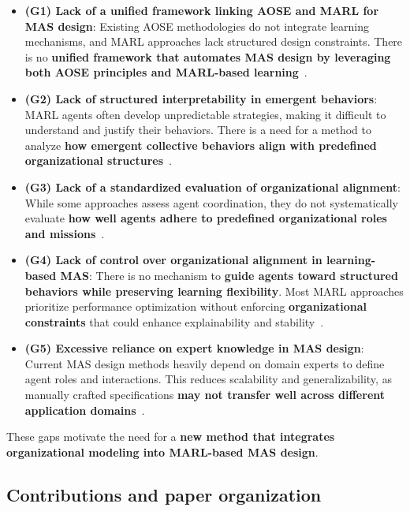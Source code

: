 \documentclass[pdflatex,sn-mathphys-num]{sn-jnl}%
\theoremstyle{thmstyleone}%
\theoremstyle{thmstyletwo}%
\theoremstyle{thmstylethree}%
\begin{document}
\begin{itemize}
    \item \textbf{(G1) Lack of a unified framework linking AOSE and MARL for MAS design}: Existing AOSE methodologies do not integrate learning mechanisms, and MARL approaches lack structured design constraints. There is no \textbf{unified framework that automates MAS design by leveraging both AOSE principles and MARL-based learning}~\cite{Cossentino2014}.
    
    \item \textbf{(G2) Lack of structured interpretability in emergent behaviors}: MARL agents often develop unpredictable strategies, making it difficult to understand and justify their behaviors. There is a need for a method to analyze \textbf{how emergent collective behaviors align with predefined organizational structures}~\cite{Du2022}.
    
    \item \textbf{(G3) Lack of a standardized evaluation of organizational alignment}: While some approaches assess agent coordination, they do not systematically evaluate \textbf{how well agents adhere to predefined organizational roles and missions}~\cite{Papoudakis2021}.
    
    \item \textbf{(G4) Lack of control over organizational alignment in learning-based MAS}: There is no mechanism to \textbf{guide agents toward structured behaviors while preserving learning flexibility}. Most MARL approaches prioritize performance optimization without enforcing \textbf{organizational constraints} that could enhance explainability and stability~\cite{Oroojlooy2023}.
    
    \item \textbf{(G5) Excessive reliance on expert knowledge in MAS design}: Current MAS design methods heavily depend on domain experts to define agent roles and interactions. This reduces scalability and generalizability, as manually crafted specifications \textbf{may not transfer well across different application domains}~\cite{Nguyen2020}.
\end{itemize}

These gaps motivate the need for a \textbf{new method that integrates organizational modeling into MARL-based MAS design}.

\subsection{Contributions and paper organization}
\end{document}
